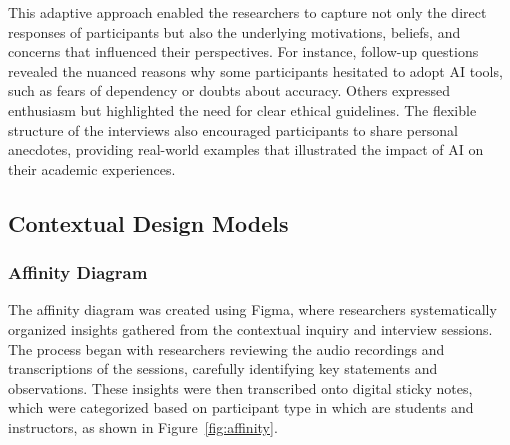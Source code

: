 \documentclass[sigconf,natbib=true]{acmart}
\begin{document}
This adaptive approach enabled the researchers to capture not only the direct responses of participants but also the underlying motivations, beliefs, and concerns that influenced their perspectives. For instance, follow-up questions revealed the nuanced reasons why some participants hesitated to adopt AI tools, such as fears of dependency or doubts about accuracy. Others expressed enthusiasm but highlighted the need for clear ethical guidelines. The flexible structure of the interviews also encouraged participants to share personal anecdotes, providing real-world examples that illustrated the impact of AI on their academic experiences. 

\subsection{Contextual Design Models}
\subsubsection{Affinity Diagram}
The affinity diagram was created using Figma, where researchers systematically organized insights gathered from the contextual inquiry and interview sessions. The process began with researchers reviewing the audio recordings and transcriptions of the sessions, carefully identifying key statements and observations. These insights were then transcribed onto digital sticky notes, which were categorized based on participant type in which are students and instructors, as shown in Figure~\ref{fig:affinity}. 
\end{document}
